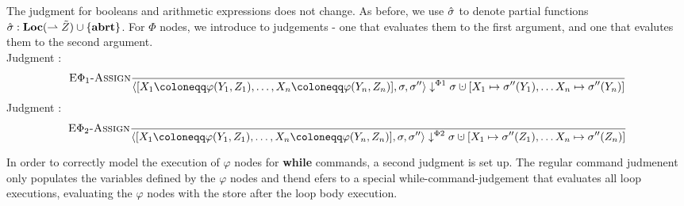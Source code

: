 The judgment for booleans and arithmetic expressions does not change.
As before, we use $\hat{\sigma}{}$ to denote partial functions
$\hat{\sigma}{}: \textbf{Loc} (\rightharpoonup \tilde{Z}) \cup \{\textbf{abrt}\}$.
For $\Phi$ nodes, we introduce to judgements - one that evaluates them to the first argument,
and one that evalutes them to the second argument.
\\
Judgment :
\begin{align*}
    &\bsrule{E$\Phi_1$-Assign}{}
    {\bigsteppl{\defaultphilistn}{\store}{\store''}{\storeassign{\store}{X_1 \mapsto \store''(Y_1),\ldots X_n \mapsto \store''(Y_n)}}}\\
\end{align*}
Judgment :
\begin{align*}
    &\bsrule{E$\Phi_2$-Assign}{}
    {\bigsteppr{\defaultphilistn}{\store}{\store''}{\storeassign{\store}{X_1 \mapsto \store''(Z_1),\ldots X_n \mapsto \store''(Z_n)}}}\\
\end{align*}

In order to correctly model the execution of $\varphi$ nodes for \textbf{while} commands,
a second judgment is set up.
The regular command judmenent only populates the variables defined by the $\varphi$ nodes
and thend efers to a special while-command-judgement that evaluates all loop executions,
evaluating the $\varphi$ nodes with the store after the loop body execution.

